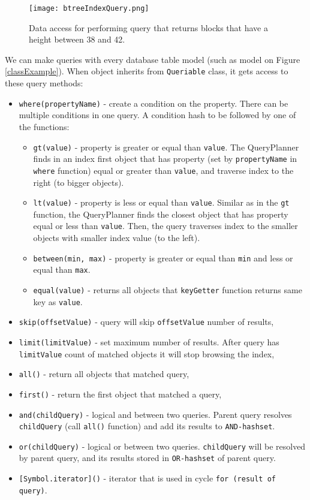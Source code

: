 \begin{figure}[h]
    \centering
    \texttt{[image: btreeIndexQuery.png]}
    \caption{Data access for performing query that returns blocks that have a height between 38 and 42.}
    \label{btreeQuery}
\end{figure}


We can make queries with every database table model (such as model on Figure \ref{classExample}). When object inherits from \texttt{Queriable} class, it gets access to these query methods:
\begin{itemize}
    \item \texttt{where(propertyName)} - create a condition on the property. There can be multiple conditions in one query. A condition hash to be followed by one of the functions: 
    \begin{itemize}
        \item \texttt{gt(value)} - property is greater or equal than \texttt{value}. The QueryPlanner finds in an index first object that has property (set by \texttt{propertyName} in \texttt{where} function) equal or greater than \texttt{value}, and traverse index to the right (to bigger objects).
        \item \texttt{lt(value)} - property is less or equal than \texttt{value}. Similar as in the \texttt{gt} function, the QueryPlanner finds the closest object that has property equal or less than \texttt{value}. Then, the query traverses index to the smaller objects with smaller index value (to the left).
        \item \texttt{between(min, max)} - property is greater or equal than \texttt{min} and less or equal than \texttt{max}. 
        \item \texttt{equal(value)} - returns all objects that \texttt{keyGetter} function returns same key as \texttt{value}. 
    \end{itemize}
    \item \texttt{skip(offsetValue)} - query will skip \texttt{offsetValue} number of results,
    \item \texttt{limit(limitValue)} - set maximum number of results. After query has \texttt{limitValue} count of matched objects it will stop browsing the index,
    \item \texttt{all()} - return all objects that matched query,
    \item \texttt{first()} - return the first object that matched a query,
    \item \texttt{and(childQuery)} - logical and between two queries. Parent query resolves \texttt{childQuery} (call \texttt{all()} function) and add its results to \texttt{AND-hashset}.
    \item \texttt{or(childQuery)} - logical or between two queries. \texttt{childQuery} will be resolved by parent query, and its results stored in \texttt{OR-hashset} of parent query. 
    \item \texttt{[Symbol.iterator]()} - iterator that is used in cycle \texttt{for (result of query)}.
\end{itemize}



